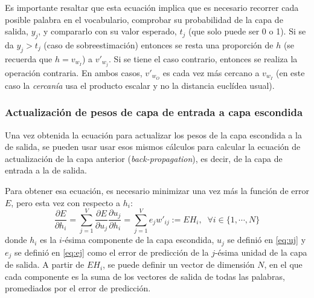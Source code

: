 Es importante resaltar que esta ecuación implica que es necesario recorrer cada posible palabra en el vocabulario, comprobar su probabilidad de la capa de salida, $y_j$, y
compararlo con su valor esperado, $t_j$ (que solo puede ser 0 o 1). Si se da $y_j > t_j $ (caso de sobreestimación) entonces se resta una proporción de $h$ (se recuerda que
$h=v_{w_I}$) a $v'_{w_j}$. Si se tiene el caso contrario, entonces se realiza la operación contraria. En ambos casos, $v'_{w_O}$ es cada vez más cercano a $v_{w_I}$ (en
este caso la \textit{cercanía} usa el producto escalar y no la distancia euclídea usual).

\subsubsection*{Actualización de pesos de capa de entrada a capa escondida}

Una vez obtenida la ecuación para actualizar los pesos de la capa escondida a la de salida, se pueden usar usar esos mismos cálculos para calcular
la ecuación de actualización de la capa anterior (\textit{back-propagation}), es decir, de la capa de entrada a la de salida.

Para obtener esa ecuación, es necesario minimizar una vez más la función de error $E$, pero esta vez con respecto a $h_i$:
\begin{equation}
  \frac{\partial E}{\partial h_i} = \sum_{j=1}^V\frac{\partial E}{\partial u_j} \frac{\partial u_j}{\partial h_i} = \sum_{j=1}^Ve_j w'_{ij} := EH_i, \;\; \forall i \in \{1, \cdots, N\}
\end{equation}
donde $h_i$ es la $i$-ésima componente de la capa escondida, $u_j$ se definió en \ref*{eq:uj} y $e_j$ se definió en \ref*{eq:ej} como el error de predicción
de la $j$-ésima unidad de la capa de salida. A partir de $EH_i$, se puede definir un vector de dimensión $N$, en el que cada componente es la suma de los vectores
de salida de todas las palabras, promediados por el error de predicción.

